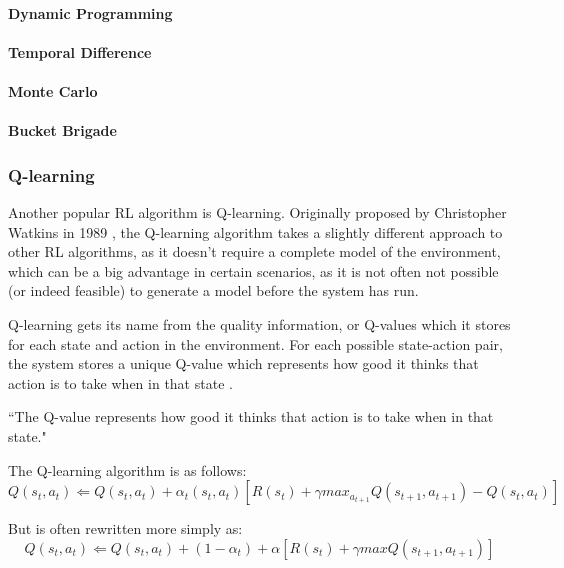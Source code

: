 \documentclass[a4paper,oneside]{report}
\begin{document}
\paragraph{Dynamic Programming} 

\paragraph{Temporal Difference} 

\paragraph{Monte Carlo} 

\paragraph{Bucket Brigade}

\subsubsection{Q-learning}

Another popular RL algorithm is Q-learning. Originally proposed by Christopher Watkins in 1989 \cite{Watkins:1989mi}, the Q-learning algorithm takes a slightly different approach to other RL algorithms, as it doesn't require a complete model of the environment, which can be a big advantage in certain scenarios, as it is not often not possible (or indeed feasible) to generate a model before the system has run.

Q-learning gets its name from the quality information, or Q-values which it stores for each state and action in the environment. For each possible state-action pair, the system stores a unique Q-value which represents how good it thinks that action is to take when in that state .

``The Q-value represents how good it thinks that action is to take when in that state."

\noindent The Q-learning algorithm is as follows:
\begin{equation*}
	Q(s_t,a_t) \Leftarrow Q(s_t, a_t) + \alpha_t(s_t, a_t)[R(s_t) + \gamma max_{a_{t+1}} Q(s_{t+1}, a_{t+1}) - Q(s_t, a_t)]
\end{equation*}

\noindent But is often rewritten more simply as:
\begin{equation*}
	Q(s_t,a_t) \Leftarrow Q(s_t, a_t) + (1 -\alpha_t) + \alpha[R(s_t) + \gamma max Q(s_{t+1}, a_{t+1})]
\end{equation*}
\end{document}
